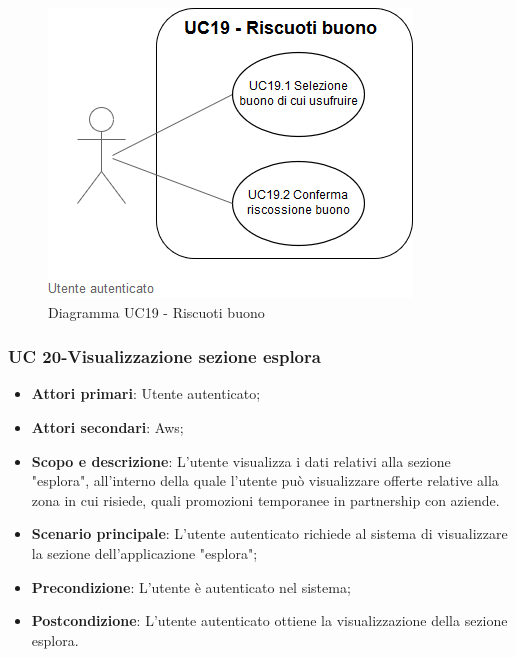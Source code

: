     \begin{figure}[h!]
           \begin{center}
           \includegraphics[scale=0.50]{immagini/19.png}    
           \caption{Diagramma UC19 - Riscuoti buono}
           \end{center}
            \end{figure}  
   
     
               
       \subsubsection{UC 20-Visualizzazione sezione esplora}  
      \begin{itemize}
        \item \textbf{Attori primari}: Utente autenticato;
        \item \textbf{Attori secondari}: Aws;
        \item \textbf{Scopo e descrizione}: L'utente visualizza i dati relativi alla sezione "esplora", all'interno della quale l'utente può visualizzare offerte relative alla zona in cui risiede, quali promozioni temporanee in partnership con aziende.
            
        \item \textbf{Scenario principale}: L'utente autenticato richiede al sistema di visualizzare la sezione dell'applicazione "esplora";
        \item \textbf{Precondizione}: L'utente è autenticato nel sistema;
        \item \textbf{Postcondizione}: L'utente autenticato ottiene la visualizzazione della sezione esplora.
        \end{itemize}        
     
                 
